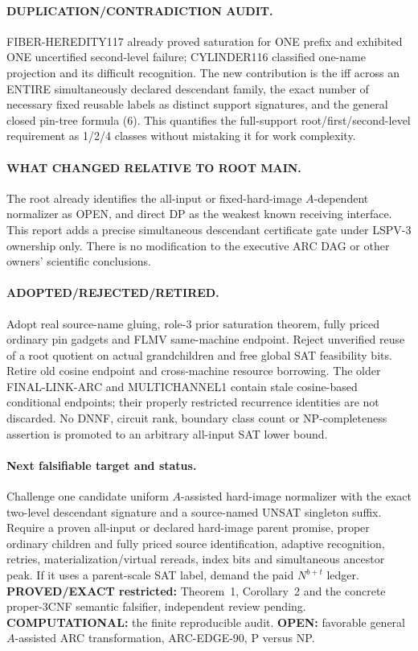 \documentclass[11pt]{article}
\begin{document}
\paragraph{DUPLICATION/CONTRADICTION AUDIT.}
FIBER-HEREDITY117 already proved
saturation for ONE prefix and exhibited
ONE uncertified second-level failure;
CYLINDER116 classified one-name
projection and its difficult recognition.
The new contribution is the iff across
an ENTIRE simultaneously declared
descendant family, the exact
number of necessary fixed reusable
labels as distinct support signatures,
and the general closed pin-tree
formula (6). This quantifies the
full-support root/first/second-level
requirement as 1/2/4 classes without
mistaking it for work complexity.

\paragraph{WHAT CHANGED RELATIVE TO ROOT MAIN.}
The root already identifies the
all-input or fixed-hard-image
$A$-dependent normalizer as OPEN,
and direct DP as the weakest
known receiving interface.
This report adds a precise
simultaneous descendant certificate
gate under LSPV-3 ownership only.
There is no modification to the
executive ARC DAG or other owners'
scientific conclusions.

\paragraph{ADOPTED/REJECTED/RETIRED.}
Adopt real source-name gluing,
role-3 prior saturation theorem,
fully priced ordinary pin gadgets
and FLMV same-machine endpoint.
Reject unverified reuse of a
root quotient on actual grandchildren
and free global SAT feasibility
bits. Retire old cosine
endpoint and cross-machine
resource borrowing. The older
FINAL-LINK-ARC and MULTICHANNEL1
contain stale cosine-based
conditional endpoints; their
properly restricted recurrence
identities are not discarded.
No DNNF, circuit rank, boundary
class count or NP-completeness
assertion is promoted to an
arbitrary all-input SAT lower bound.

\paragraph{Next falsifiable target and status.}
Challenge one candidate uniform
$A$-assisted hard-image normalizer
with the exact two-level descendant
signature and a source-named
UNSAT singleton suffix. Require
a proven all-input or declared
hard-image parent promise,
proper ordinary children and
fully priced source identification,
adaptive recognition, retries,
materialization/virtual rereads,
index bits and simultaneous
ancestor peak. If it uses a
parent-scale SAT label, demand
the paid $N^{b+t}$ ledger.
\textbf{PROVED/EXACT restricted:}
Theorem~1, Corollary~2 and the
concrete proper-3CNF semantic
falsifier, independent review
pending. \textbf{COMPUTATIONAL:}
the finite reproducible audit.
\textbf{OPEN:} favorable general
$A$-assisted ARC transformation,
ARC-EDGE-90, P versus NP.
\end{document}
